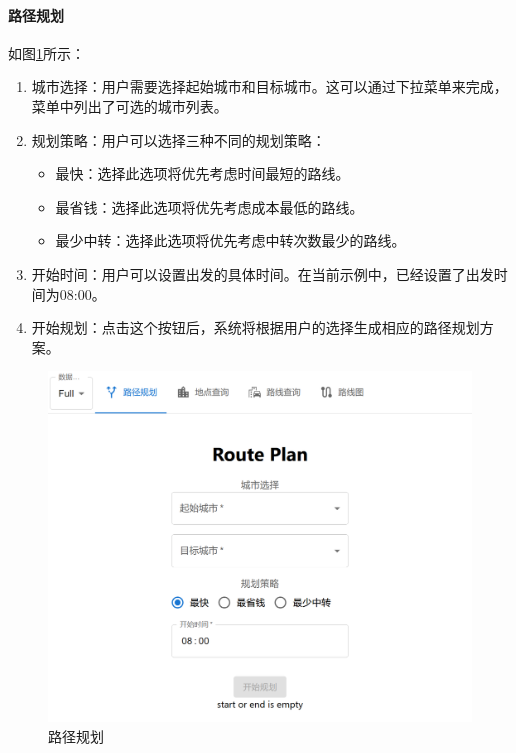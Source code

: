 \documentclass[10pt]{article}
\begin{document}
    \paragraph{路径规划} 如图\ref{fig:screenshot001}所示：
    \begin{enumerate}
        \item 城市选择：用户需要选择起始城市和目标城市。这可以通过下拉菜单来完成，菜单中列出了可选的城市列表。
        \item 规划策略：用户可以选择三种不同的规划策略：
        \begin{itemize}
            \item 最快：选择此选项将优先考虑时间最短的路线。
            \item 最省钱：选择此选项将优先考虑成本最低的路线。
            \item 最少中转：选择此选项将优先考虑中转次数最少的路线。
        \end{itemize}
        \item 开始时间：用户可以设置出发的具体时间。在当前示例中，已经设置了出发时间为08:00。
        \item 开始规划：点击这个按钮后，系统将根据用户的选择生成相应的路径规划方案。
    \end{enumerate}
    \begin{figure}
        \centering
        \includegraphics[width=\linewidth]{img/screenshot001}
        \caption[]{路径规划}
        \label{fig:screenshot001}
    \end{figure}
\end{document}
